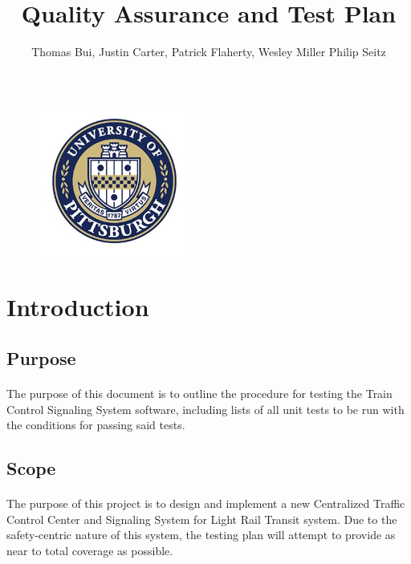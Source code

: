 \documentclass{article}
\title{\textbf{Quality Assurance and Test Plan}}
\begin{document}
\begin{figure}
    \centering
    \includegraphics[height=5cm,width=5cm]{pitt-min.jpg}
\end{figure}

\author{Thomas Bui, Justin Carter, Patrick Flaherty, Wesley Miller Philip Seitz}

\date{}

\maketitle

\newenvironment{subs}
  {\adjustwidth{3em}{0pt}}
  {\endadjustwidth}

\pagebreak 

\tableofcontents
\newpage

\section{Introduction}

    \subsection{Purpose}
    \paragraph{}
    The purpose of this document is to outline the procedure for testing the Train Control Signaling System software, including lists of all unit tests to be run with the conditions for passing said tests.
    
    \subsection{Scope}
    \paragraph{}
    The  purpose  of  this  project  is  to  design  and  implement  a  new  Centralized Traffic  Control  Center  and  Signaling  System  for  Light  Rail  Transit  system. Due to the safety-centric nature of this system, the testing plan will attempt to provide as near to total coverage as possible.
    
\end{document}
